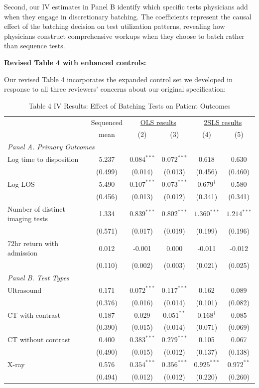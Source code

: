 \documentclass[11pt]{article}
\newcommand{\1}{\hbox{\rm 1\kern-.35em 1}}
\begin{document}
Second, our IV estimates in Panel B identify which specific tests physicians add when they engage in discretionary batching. The coefficients represent the causal effect of the batching decision on test utilization patterns, revealing how physicians construct comprehensive workups when they choose to batch rather than sequence tests.

\textbf{Revised Table 4 with enhanced controls:}

Our revised Table 4 incorporates the expanded control set we developed in response to all three reviewers' concerns about our original specification:


\begin{table}[H]
\centering
\caption*{Table 4     IV Results: Effect of Batching Tests on Patient Outcomes}
\label{tab:results_table}
\begin{threeparttable}
\begin{tabular}{lccccc}
\toprule
& Sequenced & \multicolumn{2}{c}{\underline{OLS results}} & \multicolumn{2}{c}{\underline{2SLS results}} \\
& mean & (2) & (3) & (4) & (5) \\
\midrule
\multicolumn{6}{l}{\textit{Panel A. Primary Outcomes}} \\[0.5em]
Log time to disposition & 5.237 & $0.084^{***}$ & $0.072^{***}$ & $0.618$ & $0.630$ \\
& (0.499) & (0.014) & (0.013) & (0.456) & (0.460) \\[0.5em]
Log LOS & 5.490 & $0.107^{***}$ & $0.073^{***}$ & $0.679^{\dagger}$ & $0.580$ \\
& (0.456) & (0.013) & (0.012) & (0.341) & (0.341) \\[0.5em]
Number of distinct imaging tests & 1.334 & $0.839^{***}$ & $0.802^{***}$ & $1.360^{***}$ & $1.214^{***}$ \\
& (0.571) & (0.017) & (0.019) & (0.199) & (0.196) \\[0.5em]
72hr return with admission & 0.012 & -0.001 & 0.000 & -0.011 & -0.012 \\
& (0.110) & (0.002) & (0.003) & (0.021) & (0.025) \\[0.5em]

\multicolumn{6}{l}{\textit{Panel B. Test Types}} \\[0.5em]
Ultrasound & 0.171 & $0.072^{***}$ & $0.117^{***}$ & 0.162 & 0.089 \\
& (0.376) & (0.016) & (0.014) & (0.101) & (0.082) \\[0.5em]
CT with contrast & 0.187 & 0.029 & $0.051^{**}$ & $0.168^{\dagger}$ & 0.085 \\
& (0.390) & (0.015) & (0.014) & (0.071) & (0.069) \\[0.5em]
CT without contrast & 0.400 & $0.383^{***}$ & $0.279^{***}$ & 0.105 & 0.067 \\
& (0.490) & (0.015) & (0.012) & (0.137) & (0.138) \\[0.5em]
X-ray & 0.576 & $0.354^{***}$ & $0.356^{***}$ & $0.925^{***}$ & $0.972^{**}$ \\
& (0.494) & (0.012) & (0.012) & (0.220) & (0.260) \\[0.5em]


\end{tabular}
\end{threeparttable}
\end{table}
\end{document}
